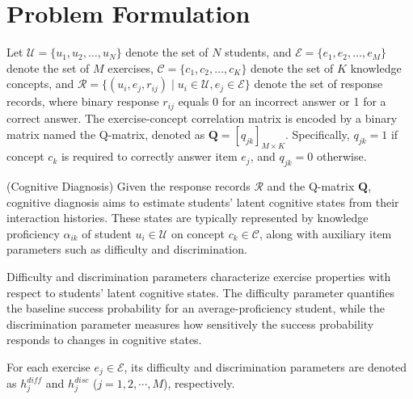 \documentclass[runningheads]{llncs}
\begin{document}
\section{Problem Formulation}

Let $\mathcal{U} = \{u_1, u_2, \dots, u_N\}$ denote the set of $N$ students, and $\mathcal{E} = \{e_1, e_2, \dots, e_M\}$ denote the set of $M$ exercises, $\mathcal{C} = \{c_1, c_2, \dots, c_K\}$ denote the set of $K$ knowledge concepts, and  $\mathcal{R}=\{(u_i,e_j,r_{ij})\mid u_i\in\mathcal{U}, e_j\in\mathcal{E}\}$ denote the set of response records, where binary response $r_{ij}$ equals 0 for an incorrect answer or 1 for a correct answer. 
The exercise-concept correlation matrix is encoded by a binary matrix named the Q-matrix, denoted as $\bm{Q}=[q_{jk}]_{M \times K}$. Specifically, $q_{jk}=1$ if concept $c_k$ is required to correctly answer item $e_j$, and $q_{jk}=0$ otherwise.

\begin{definition}\label{def:cd}
(Cognitive Diagnosis) Given the response records $\mathcal{R}$ and the Q-matrix $\bm{Q}$, cognitive diagnosis aims to estimate students' latent cognitive states from their interaction histories. These states are typically represented by knowledge proficiency $\alpha_{ik}$ of student $u_i \in \mathcal{U}$ on concept $c_k \in \mathcal{C}$, along with auxiliary item parameters such as difficulty and discrimination.
\end{definition}

\begin{definition}\label{def:dd}
Difficulty and discrimination parameters characterize exercise properties with respect to students' latent cognitive states. The difficulty parameter quantifies the baseline success probability for an average-proficiency student, while the discrimination parameter measures how sensitively the success probability responds to changes in cognitive states.
\end{definition}

For each exercise $e_j\in\mathcal{E}$, its difficulty and discrimination parameters are denoted as $h_j^{diff}$ and $h_j^{disc}$ ($j=1,2,\cdots,M$), respectively.

\end{document}
